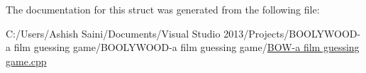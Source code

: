 The documentation for this struct was generated from the following file\+:\begin{DoxyCompactItemize}
\item 
C\+:/\+Users/\+Ashish Saini/\+Documents/\+Visual Studio 2013/\+Projects/\+B\+O\+O\+L\+Y\+W\+O\+O\+D-\/a film guessing game/\+B\+O\+O\+L\+Y\+W\+O\+O\+D-\/a film guessing game/\hyperlink{_b_o_w-a_01film_01guessing_01game_8cpp}{B\+O\+W-\/a film guessing game.\+cpp}\end{DoxyCompactItemize}
